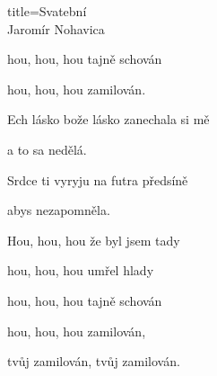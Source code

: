 \begin{song}{title=\predtitle\centering Svatební \\\large Jaromír Nohavica \vspace*{-0.3cm}}
\begin{centerjustified}
\begin{varwidth}[t]{0.48\textwidth}
hou, hou, hou tajně schován

hou, hou, hou zamilován.


\sloka
Ech lásko bože lásko zanechala si mě

a to sa nedělá.

Srdce ti vyryju na futra předsíně

abys nezapomněla.


Hou, hou, hou že byl jsem tady

hou, hou, hou umřel hlady

hou, hou, hou tajně schován

hou, hou, hou zamilován,

tvůj zamilován, tvůj zamilován.

\end{varwidth}

\end{centerjustified}
\setcounter{Slokočet}{0}
\end{song}

